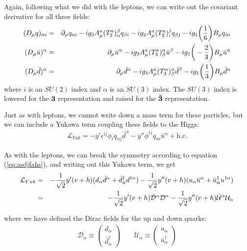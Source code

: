 \documentclass[12pt,epsf]{article}
\def\nolabel{\nonumber }
\def\nolabel{\nonumber }
\begin{document}
Again, following what we did with the leptons, we can write out the
covariant derivative for all three fields:
\begin{eqnarray}
(D_{\mu}q)_{\alpha i} &=& \partial_{\mu} q_{\alpha i} -
ig_3A^a_{\mu}(T^a_2)^{\beta}_{\alpha}q_{\beta i} - ig_2
A^a_{\mu}(T^a_2)^j_iq_{\beta j} - ig_1 \bigg({1\over 6}\bigg)
B_{\mu}q_{\alpha i} \label{eq:qcovder} \\
(D_{\mu} \bar u)^{\alpha} &=& \partial_{\mu}\bar u^{\alpha} -
ig_3A^a_{\mu}(T^a_3)^{\alpha}_{\beta}\bar u^{\beta} -
ig_1\bigg(-{2\over 3}\bigg)B_{\mu}\bar u^{\alpha} \\
(D_{\mu}\bar d)^{\alpha} &=& \partial_{\mu} \bar d^{\alpha} -
ig_3A^a_{\mu}(T^{\alpha}_3)^{\alpha}_{\beta}\bar d^{\beta} -
ig_1\bigg({1\over 3}\bigg) B_{\mu} \bar d^{\alpha} 
\end{eqnarray}
where $i$ is an $SU(2)$ index and $\alpha$ is an $SU(3)$ index.  The
$SU(3)$ index is lowered for the $\bf 3\rm$ representation and raised
for the $\bf \bar 3\rm$ representation.  

Just as with leptons, we cannot write down a mass term for these
particles, but we can include a Yukawa term coupling these fields to
the Higgs:
\begin{eqnarray}
\mathcal{L}_{Yuk} = -y'\epsilon^{ij}\phi_i q_{\alpha j} \bar d^{\alpha}
- y'' \phi^{\dagger i } q_{\alpha i } \bar u^{\alpha} + \mbox{h.c.} \nolabel
\end{eqnarray}

As with the leptons, we can break the symmetry according to equation
(\ref{eq:asdjfahs}), and writing out this Yukawa term, we get
\begin{eqnarray}
\mathcal{L}_{Yuk} &=& -{1\over \sqrt{2}} y' (v+h)(d_{\alpha} \bar
d^{\alpha} + \bar d^{\dagger}_{\alpha}d^{\dagger \alpha}) - {1\over
\sqrt{2}} y'' (v+h)(u_{\alpha}\bar u^{\alpha} + \bar
u^{\dagger}_{\alpha} u^{\dagger \alpha}) \nolabel \\
&=& -{1\over \sqrt{2}} y' (v+h)\mathcal{\bar D}^{\alpha}
\mathcal{D}^{\alpha} - {1\over \sqrt{2}} y'' (v+h)\mathcal{\bar
U}^{\alpha}\mathcal{U}_{\alpha}\nolabel
\end{eqnarray}

where we have defined the Dirac fields for the up and down quarks:
\begin{eqnarray}
\mathcal{D}_{\alpha} \equiv \begin{pmatrix} d_{\alpha} \\ \bar
d^{\dagger}_{\alpha} \end{pmatrix}
\qquad 
\mathcal{U}_{\alpha} \equiv 
\begin{pmatrix}
u_{\alpha} \\ \bar u^{\dagger}_{\alpha}
\end{pmatrix}\nolabel
\end{eqnarray}
\end{document}
